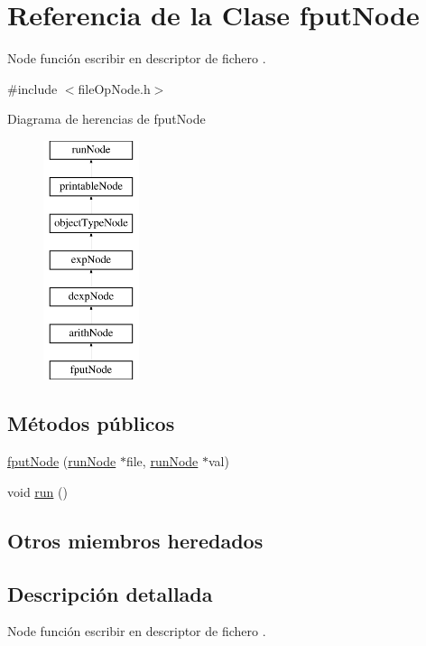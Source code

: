 \hypertarget{classfputNode}{\section{Referencia de la Clase fput\-Node}
\label{classfputNode}
}


Node función escribir en descriptor de fichero .  




{\ttfamily \#include $<$file\-Op\-Node.\-h$>$}

Diagrama de herencias de fput\-Node\begin{figure}[H]
\begin{center}
\leavevmode
\includegraphics[height=7.000000cm]{classfputNode}
\end{center}
\end{figure}
\subsection*{Métodos públicos}
\begin{DoxyCompactItemize}
\item 
\hyperlink{classfputNode_a86bc8a68a443cf689a4631d4aaddb8a8}{fput\-Node} (\hyperlink{classrunNode}{run\-Node} $\ast$file, \hyperlink{classrunNode}{run\-Node} $\ast$val)
\item 
void \hyperlink{classfputNode_ac1e5fdc58f9d57e1b7782b1eda9e273f}{run} ()
\end{DoxyCompactItemize}
\subsection*{Otros miembros heredados}


\subsection{Descripción detallada}
Node función escribir en descriptor de fichero . 

